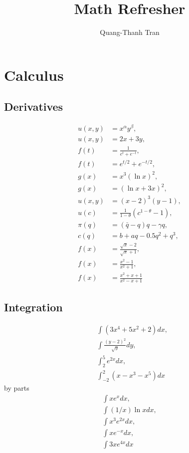 \documentclass[10pt,a4paper]{article}
\title{Math Refresher}
\author{Quang-Thanh Tran}
\theoremstyle{definition}\newtheorem{definition}{Definition}
\theoremstyle{definition}\newtheorem{fact}{Fact}
\theoremstyle{definition}\newtheorem{remark}{Remark}
\theoremstyle{definition}\newtheorem{ex}{Ex.}
\theoremstyle{definition}\newtheorem{project}{Project}
\theoremstyle{definition}\newtheorem{problem}{Problem}
\theoremstyle{definition}\newtheorem{example}{Example}
\begin{document}
	\maketitle
	
	\section{Calculus}
	\subsection{Derivatives}
	\begin{align}
		u(x,y) &= x^\alpha y^\beta, \\
		u(x,y) &= 2x + 3y, \\
		f(t) &= \frac{1}{e^t+e^{-t}}, \\
		f(t) &= e^{t/2}+e^{-t/2}, \\
		g(x) &= x^3(\ln x)^2, \\
		g(x) &= (\ln x+3x)^2, \\
		u(x,y) &= (x-2)^3(y-1), \\
		u(c) &= \frac{1}{1-\theta} (c^{1-\theta} - 1), \\
		\pi(q) &= (\bar{q}-q)q - \gamma q, \\
		c(q) &= b + a q - 0.5 q^2 + q^3, \\
		f(x) &= \frac{\sqrt{x}-2}{\sqrt{x}+1}, \\
		f(x) &=  \frac{x^2-1}{x^2+1}, \\
		f(x) &=  \frac{x^2+x+1}{x^2-x+1}
	\end{align}
	
	\subsection{Integration}
	\begin{align}
		&\int (3x^4+5x^2+2)dx, \\
		&\int \frac{(y-2)^2}{\sqrt{y}}dy, \\
		&\int_2^5 e^{2x}dx, \\
		&\int_{-2}^2 (x-x^3-x^5)dx 
	\end{align}
	by parts
	\begin{align}
		\int xe^x dx, \\
		\int (1/x)\ln x dx, \\
		\int x^3 e^{2x} dx, \\
		 \int xe^{-x} dx, \\
		 \int 3x e^{4x}dx
	\end{align}
	
\end{document}
